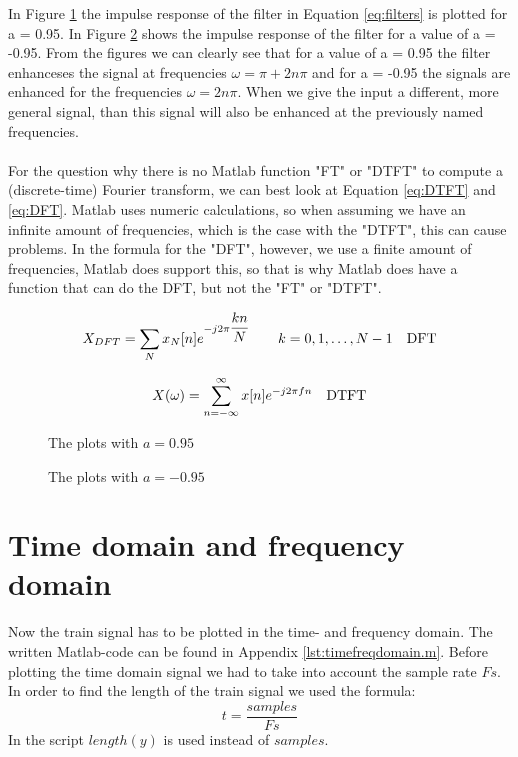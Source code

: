 \documentclass[final]{scrreprt} %
\begin{document}
In Figure \ref{fig:a0.95-plots} the impulse response of the filter in Equation \ref{eq:filters} is plotted for a = 0.95. 
In Figure \ref{fig:a0.-95-plots} shows the impulse response of the filter for a value of a = -0.95.
From the figures we can clearly see that for a value of a = 0.95 the filter enhanceses the signal at frequencies $\omega = \pi + 2n \pi$ and for a = -0.95 the signals are enhanced for the frequencies $\omega = 2n \pi$. 
When we give the input a different, more general signal, than this signal will also be enhanced at the previously named frequencies. 
\\
\\
For the question why there is no Matlab function "FT" or "DTFT" to compute a (discrete-time) Fourier transform, we can best look at Equation \ref{eq:DTFT} and \ref{eq:DFT}.
Matlab uses numeric calculations, so when assuming we have an infinite amount of frequencies, which is the case with the "DTFT", this can cause problems. 
In the formula for the "DFT", however, we use a finite amount of frequencies, Matlab does support this, so that is why Matlab does have a function that can do the DFT, but not the "FT" or "DTFT".


\begin{equation}
X_{DFT} = \sum_{N} x_N[n]e^{-j2\pi \dfrac{kn}{N}} \quad \quad k = 0, 1, \dots, N - 1 \quad \text{DFT}\\
\label{eq:DFT}
\end{equation}

\begin{equation}
X(\omega) = \sum_{n= -\infty}^{\infty} x[n]e^{-j2\pi fn} \quad \text{DTFT}\\
\label{eq:DTFT}
\end{equation}




\begin{figure}[H]
	\centering
    	\setlength\figureheight{3.5cm}
    	\setlength{}
    	    	
    	\caption{The plots with $a=0.95$}
    	\label{fig:a0.95-plots}
\end{figure}
\begin{figure}[H]
	\centering
    	\setlength\figureheight{3.5cm}
    	\setlength{}
    	    	
    	\caption{The plots with $a=-0.95$}
    	\label{fig:a0.-95-plots}
\end{figure}


\section{Time domain and frequency domain}
Now the train signal has to be plotted in the time- and frequency domain.
The written Matlab-code can be found in Appendix \ref{lst:timefreqdomain.m}.
Before plotting the time domain signal we had to take into account the sample rate $Fs$.
In order to find the length of the train signal we used the formula:
\begin{equation}
t = \frac{samples}{Fs}
\end{equation}
In the script $length(y)$ is used instead of $samples$.
\end{document}
